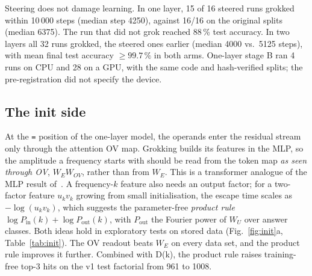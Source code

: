 \documentclass[10pt]{article}
\newcommand{\Dk}{D(k)}
\begin{document}
Steering does not damage learning. In one layer, 15 of 16 steered runs grokked within 10\,000 steps (median step 4250),
against 16/16 on the original splits (median 6375). The run that did not grok reached 88\,\% test accuracy. In two layers
all 32 runs grokked, the steered ones earlier (median 4000 vs.\ 5125 steps), with mean final test accuracy $\ge99.7\,\%$
in both arms. One-layer stage B ran 4 runs on CPU and 28 on a GPU, with the same code and hash-verified splits; the
pre-registration did not specify the device.

\subsection{The init side}
\label{sec:init}
At the \texttt{=} position of the one-layer model, the operands enter the residual stream only through the attention OV
map. Grokking builds its features in the MLP, so the amplitude a frequency starts with should be read from the token map
\emph{as seen through OV}, $W_E W_{OV}$, rather than from $W_E$. This is a transformer analogue of the MLP result
of~\citet{ding2024survival}. A frequency-$k$ feature also needs an output factor; for a two-factor feature $u_kv_k$
growing from small initialisation, the escape time scales as $-\log(u_kv_k)$, which suggests the parameter-free
\emph{product rule} $\log P_{\text{in}}(k)+\log P_{\text{out}}(k)$, with $P_{\text{out}}$ the Fourier power of $W_U$ over
answer classes. Both ideas hold in exploratory tests on stored data (Fig.~\ref{fig:init}a, Table~\ref{tab:init}). The OV
readout beats $W_E$ on every data set, and the product rule improves it further. Combined with \Dk, the product rule raises
training-free top-3 hits on the v1 test factorial from 961 to 1008.
\end{document}
